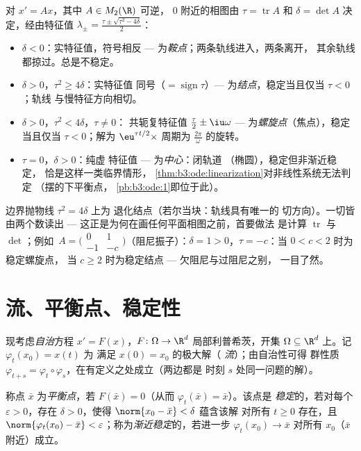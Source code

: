 \begin{example}[平面的分类]
\label{ex:b3:ode:planeclassification}
对 $x' = Ax$，其中 $A \in M_2(\R)$ 可逆，
$0$ 附近的相图由 $\tau = \operatorname{tr}A$
和 $\delta = \det A$ 决定，经由特征值 $\lambda_\pm
= \frac{\tau \pm \sqrt{\tau^2 - 4\delta}}2$：
\begin{itemize}
  \item $\delta < 0$：实特征值，符号相反 ---
        为\emph{鞍点}；两条轨线进入，两条离开，
        其余轨线都掠过。总是不稳定。
  \item $\delta > 0$，$\tau^2 \geq 4\delta$：实特征值
        同号（$= \operatorname{sign}\tau$）---
        为\emph{结点}，稳定当且仅当 $\tau < 0$；轨线
        与慢特征方向相切。
  \item $\delta > 0$，$\tau^2 < 4\delta$，$\tau \neq 0$：
        共轭复特征值 $\frac\tau2 \pm
        \iu\omega$ --- 为\emph{螺旋点}（焦点），稳定当且仅当
        $\tau < 0$；解为
        $\eu^{\tau t/2}\times$ 周期为
        $\frac{2\pi}\omega$ 的旋转。
  \item $\tau = 0$，$\delta > 0$：纯虚
        特征值 --- 为\emph{中心}：闭轨道
        （椭圆），稳定但非渐近稳定，
        恰是这样一类临界情形，
        \cref{thm:b3:ode:linearization}对非线性系统无法判定
        （摆的下平衡点，
        \cref{pb:b3:ode:1}即位于此）。
\end{itemize}
边界抛物线 $\tau^2 = 4\delta$ 上为
退化结点（若尔当块：轨线具有唯一的
切方向）。一切皆由两个数读出 ---
这正是为何在画任何平面相图之前，首要做法
是计算 $\operatorname{tr}$ 与 $\det$；例如\
$A = \bigl(\begin{smallmatrix}0 & 1\\ -1 &
-c\end{smallmatrix}\bigr)$（阻尼振子）：$\delta = 1 >
0$，$\tau = -c$：当 $0 < c < 2$ 时为稳定螺旋点，
当 $c \geq 2$ 时为稳定结点 --- 欠阻尼与过阻尼之别，
一目了然。
\end{example}

\section{流、平衡点、稳定性}

现考虑\emph{自治}方程 $x' = F(x)$，$F
\colon \Omega \to \R^d$ 局部利普希茨，开集 $\Omega
\subseteq \R^d$ 上。记 $\varphi_t(x_0) = x(t)$ 为
满足 $x(0) = x_0$ 的极大解（
\emph{流}）；由自治性可得
群性质 $\varphi_{t+s} =
\varphi_t\circ\varphi_s$，在有定义之处成立（两边都是
时刻 $s$ 处同一问题的解）。

\begin{definition}\label{def:b3:ode:stability}
称点 $\bar x$ 为\emph{平衡点}，若 $F(\bar x) =
0$（从而 $\varphi_t(\bar x) = \bar x$）。该点是
\emph{稳定}的，若对每个
$\varepsilon > 0$，存在 $\delta > 0$，使得
$\norm{x_0 - \bar x} < \delta$ 蕴含该解
对所有 $t \geq 0$ 存在，且 $\norm{\varphi_t(x_0) - \bar
x} < \varepsilon$；称为\emph{渐近稳定}的，若进一步
$\varphi_t(x_0) \to \bar x$ 对所有 $x_0$（$\bar x$ 附近）成立。
\end{definition}

